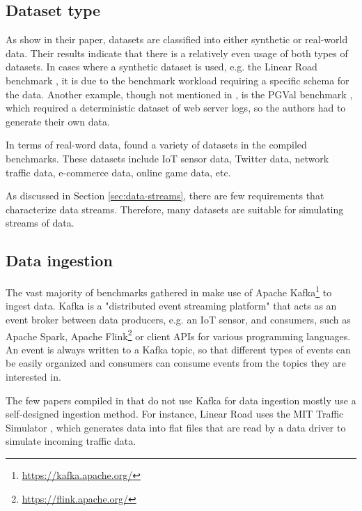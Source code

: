 \subsection{Dataset type}
As \citeauthor{yueSurveyStreamProcessing2025} \cite[Table~2]{yueSurveyStreamProcessing2025} show in their paper, datasets are classified into either synthetic or real-world data. Their results indicate that there is a relatively even usage of both types of datasets. In cases where a synthetic dataset is used, e.g. the Linear Road benchmark \cite{arasuLinearRoadStream2004}, it is due to the benchmark workload requiring a specific schema for the data. Another example, though not mentioned in \cite{yueSurveyStreamProcessing2025}, is the PGVal benchmark \cite{tahirHowReliableAre2024}, which required a deterministic dataset of web server logs, so the authors had to generate their own data.

In terms of real-word data, \citeauthor{yueSurveyStreamProcessing2025} \cite{yueSurveyStreamProcessing2025} found a variety of datasets in the compiled benchmarks. These datasets include IoT sensor data, Twitter data, network traffic data, e-commerce data, online game data, etc.

As discussed in Section \ref{sec:data-streams}, there are few requirements that characterize data streams. Therefore, many datasets are suitable for simulating streams of data.

\subsection{Data ingestion}
The vast majority of benchmarks gathered in \cite{yueSurveyStreamProcessing2025} make use of Apache Kafka\footnote{\url{https://kafka.apache.org/}} to ingest data. Kafka is a "distributed event streaming platform" \cite{ApacheKafka2025} that acts as an event broker between data producers, e.g. an IoT sensor, and consumers, such as Apache Spark, Apache Flink\footnote{\url{https://flink.apache.org/}} or client APIs for various programming languages. An event is always written to a Kafka topic, so that different types of events can be easily organized and consumers can consume events from the topics they are interested in.

The few papers compiled in \cite{yueSurveyStreamProcessing2025} that do not use Kafka for data ingestion mostly use a self-designed ingestion method. For instance, Linear Road \cite{arasuLinearRoadStream2004} uses the MIT Traffic Simulator \cite{yangMicroscopicTrafficSimulator1996}, which generates data into flat files that are read by a data driver to simulate incoming traffic data.


